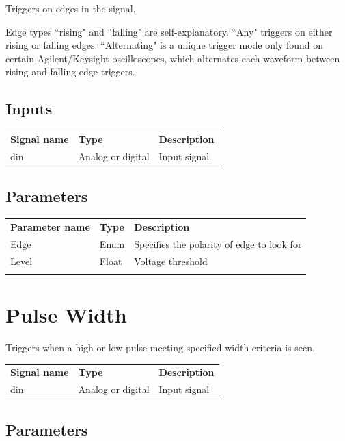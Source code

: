 Triggers on edges in the signal.

Edge types ``rising" and ``falling" are self-explanatory. ``Any" triggers on either rising or falling edges.
``Alternating" is a unique trigger mode only found on certain Agilent/Keysight oscilloscopes, which alternates each
waveform between rising and falling edge triggers.

\subsection{Inputs}

\begin{tabularx}{16cm}{llX}
\thickhline
\textbf{Signal name} & \textbf{Type} & \textbf{Description} \\
\thickhline
din & Analog or digital & Input signal \\
\end{tabularx}

\subsection{Parameters}

\begin{tabularx}{16cm}{llX}
\thickhline
\textbf{Parameter name} & \textbf{Type} & \textbf{Description} \\
\thickhline
Edge & Enum & Specifies the polarity of edge to look for\\
\thickhline
Level & Float & Voltage threshold\\
\thickhline
\end{tabularx}


\section{Pulse Width}

Triggers when a high or low pulse meeting specified width criteria is seen.

\begin{tabularx}{16cm}{llX}
\thickhline
\textbf{Signal name} & \textbf{Type} & \textbf{Description} \\
\thickhline
din & Analog or digital & Input signal \\
\end{tabularx}

\subsection{Parameters}

